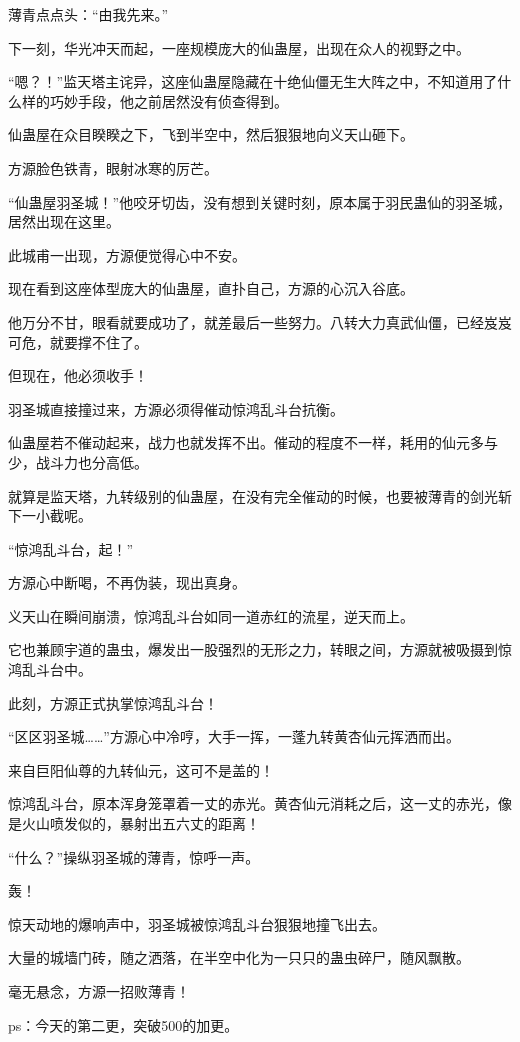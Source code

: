 \begin{this_body}
薄青点点头：“由我先来。”

下一刻，华光冲天而起，一座规模庞大的仙蛊屋，出现在众人的视野之中。

“嗯？！”监天塔主诧异，这座仙蛊屋隐藏在十绝仙僵无生大阵之中，不知道用了什么样的巧妙手段，他之前居然没有侦查得到。

仙蛊屋在众目睽睽之下，飞到半空中，然后狠狠地向义天山砸下。

方源脸色铁青，眼射冰寒的厉芒。

“仙蛊屋羽圣城！”他咬牙切齿，没有想到关键时刻，原本属于羽民蛊仙的羽圣城，居然出现在这里。

此城甫一出现，方源便觉得心中不安。

现在看到这座体型庞大的仙蛊屋，直扑自己，方源的心沉入谷底。

他万分不甘，眼看就要成功了，就差最后一些努力。八转大力真武仙僵，已经岌岌可危，就要撑不住了。

但现在，他必须收手！

羽圣城直接撞过来，方源必须得催动惊鸿乱斗台抗衡。

仙蛊屋若不催动起来，战力也就发挥不出。催动的程度不一样，耗用的仙元多与少，战斗力也分高低。

就算是监天塔，九转级别的仙蛊屋，在没有完全催动的时候，也要被薄青的剑光斩下一小截呢。

“惊鸿乱斗台，起！”

方源心中断喝，不再伪装，现出真身。

义天山在瞬间崩溃，惊鸿乱斗台如同一道赤红的流星，逆天而上。

它也兼顾宇道的蛊虫，爆发出一股强烈的无形之力，转眼之间，方源就被吸摄到惊鸿乱斗台中。

此刻，方源正式执掌惊鸿乱斗台！

“区区羽圣城……”方源心中冷哼，大手一挥，一蓬九转黄杏仙元挥洒而出。

来自巨阳仙尊的九转仙元，这可不是盖的！

惊鸿乱斗台，原本浑身笼罩着一丈的赤光。黄杏仙元消耗之后，这一丈的赤光，像是火山喷发似的，暴射出五六丈的距离！

“什么？”操纵羽圣城的薄青，惊呼一声。

轰！

惊天动地的爆响声中，羽圣城被惊鸿乱斗台狠狠地撞飞出去。

大量的城墙门砖，随之洒落，在半空中化为一只只的蛊虫碎尸，随风飘散。

毫无悬念，方源一招败薄青！

ps：今天的第二更，突破500的加更。

\end{this_body}

